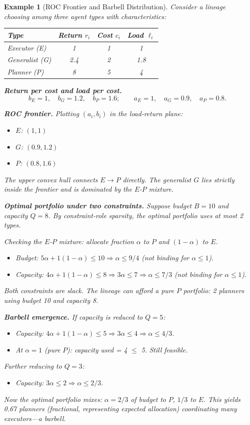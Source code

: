 \documentclass[12pt]{article}
\newtheorem{example}[theorem]{Example}
\begin{document}
\begin{example}[ROC Frontier and Barbell Distribution]
\label{ex:barbell}
Consider a lineage choosing among three agent types with characteristics:
\begin{center}
\begin{tabular}{lccc}
\toprule
Type & Return $r_i$ & Cost $c_i$ & Load $\ell_i$ \\
\midrule
Executor (E) & 1 & 1 & 1 \\
Generalist (G) & 2.4 & 2 & 1.8 \\
Planner (P) & 8 & 5 & 4 \\
\bottomrule
\end{tabular}
\end{center}

\textbf{Return per cost and load per cost.}
\[
b_E = 1, \quad b_G = 1.2, \quad b_P = 1.6; \qquad a_E = 1, \quad a_G = 0.9, \quad a_P = 0.8.
\]

\textbf{ROC frontier.} Plotting $(a_i, b_i)$ in the load-return plane:
\begin{itemize}
    \item $E$: $(1, 1)$
    \item $G$: $(0.9, 1.2)$
    \item $P$: $(0.8, 1.6)$
\end{itemize}
The upper convex hull connects $E \to P$ directly. The generalist $G$ lies \emph{strictly inside} the frontier and is dominated by the $E$-$P$ mixture.

\textbf{Optimal portfolio under two constraints.} Suppose budget $B = 10$ and capacity $Q = 8$. By constraint-role sparsity, the optimal portfolio uses at most 2 types.

Checking the $E$-$P$ mixture: allocate fraction $\alpha$ to $P$ and $(1-\alpha)$ to $E$.
\begin{itemize}
    \item Budget: $5\alpha + 1(1-\alpha) \leq 10 \Rightarrow \alpha \leq 9/4$ (not binding for $\alpha \leq 1$).
    \item Capacity: $4\alpha + 1(1-\alpha) \leq 8 \Rightarrow 3\alpha \leq 7 \Rightarrow \alpha \leq 7/3$ (not binding for $\alpha \leq 1$).
\end{itemize}
Both constraints are slack. The lineage can afford a pure $P$ portfolio: 2 planners using budget 10 and capacity 8.

\textbf{Barbell emergence.} If capacity is reduced to $Q = 5$:
\begin{itemize}
    \item Capacity: $4\alpha + 1(1-\alpha) \leq 5 \Rightarrow 3\alpha \leq 4 \Rightarrow \alpha \leq 4/3$.
    \item At $\alpha = 1$ (pure $P$): capacity used = 4 $\leq$ 5. Still feasible.
\end{itemize}
Further reducing to $Q = 3$:
\begin{itemize}
    \item Capacity: $3\alpha \leq 2 \Rightarrow \alpha \leq 2/3$.
\end{itemize}
Now the optimal portfolio mixes: $\alpha = 2/3$ of budget to $P$, $1/3$ to $E$. This yields 0.67 planners (fractional, representing expected allocation) coordinating many executors---a barbell.


\end{example}
\end{document}
